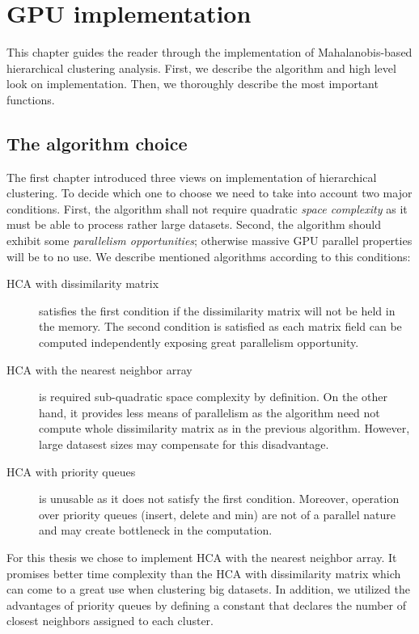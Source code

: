 \chapter{GPU implementation}

This chapter guides the reader through the implementation of Mahalanobis-based hierarchical clustering analysis. First, we describe the algorithm and high level look on implementation. Then, we thoroughly describe the most important functions.

\section{The algorithm choice}

The first chapter introduced three views on implementation of hierarchical clustering. To decide which one to choose we need to take into account two major conditions. First, the algorithm shall not require quadratic \emph{space complexity} as it must be able to process rather large datasets. Second, the algorithm should exhibit some \emph{parallelism opportunities}; otherwise massive GPU parallel properties will be to no use.  We describe mentioned algorithms according to this conditions:
\begin{description}

\item[HCA with dissimilarity matrix] satisfies the first condition if the dissimilarity matrix will not be held in the memory. The second condition is satisfied as each matrix field can be computed independently exposing great parallelism opportunity. 

\item[HCA with the nearest neighbor array] is required sub-quadratic space complexity by definition. On the other hand, it provides less means of parallelism as the algorithm need not compute whole dissimilarity matrix as in the previous algorithm. However, large datasest sizes may compensate for this disadvantage. 

\item[HCA with priority queues] is unusable as it does not satisfy the first condition. Moreover, operation over priority queues (insert, delete and min) are not of a parallel nature and may create bottleneck in the computation.

\end{description}

For this thesis we chose to implement HCA with the nearest neighbor array. It promises better time complexity than the HCA with dissimilarity matrix which can come to a great use when clustering big datasets. In addition, we utilized the advantages of priority queues by defining a constant that declares the number of closest neighbors assigned to each cluster.

